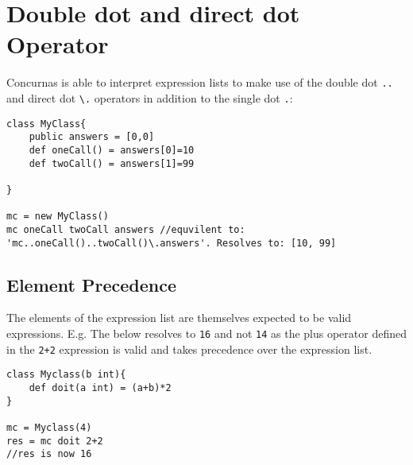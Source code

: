 \documentclass[conc-doc]{subfiles}
\begin{document}
\section{Double dot and direct dot Operator}
Concurnas is able to interpret expression lists to make use of the double dot \lstinline{..} and direct dot \lstinline{\.} operators in addition to the single dot \lstinline{.}:
\begin{lstlisting}
class MyClass{
	public answers = [0,0]
	def oneCall() = answers[0]=10
	def twoCall() = answers[1]=99
	
}

mc = new MyClass()
mc oneCall twoCall answers //equvilent to: 'mc..oneCall()..twoCall()\.answers'. Resolves to: [10, 99]
\end{lstlisting}

\subsection{Element Precedence}
The elements of the expression list are themselves expected to be valid expressions. E.g. The below resolves to \lstinline{16} and not \lstinline{14} as the plus operator defined in the \lstinline{2+2} expression is valid and takes precedence over the expression list.
\begin{lstlisting}
class Myclass(b int){
	def doit(a int) = (a+b)*2
}

mc = Myclass(4)
res = mc doit 2+2
//res is now 16
\end{lstlisting}
\end{document}
